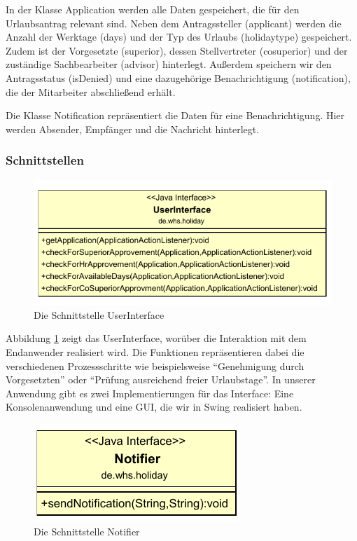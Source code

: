 In der Klasse Application werden alle Daten gespeichert, die für den Urlaubsantrag relevant sind. Neben dem Antragssteller (applicant) werden die Anzahl der Werktage (days) und der Typ des Urlaubs (holidaytype) gespeichert. Zudem ist der Vorgesetzte (superior), dessen Stellvertreter (cosuperior) und der zuständige Sachbearbeiter (advisor) hinterlegt. Außerdem speichern wir den Antragsstatus (isDenied) und eine dazugehörige Benachrichtigung (notification), die der Mitarbeiter abschließend erhält.

Die Klasse Notification repräsentiert die Daten für eine Benachrichtigung. Hier werden Absender, Empfänger und die Nachricht hinterlegt. 

\subsubsection{Schnittstellen}
\label{subsubsec:Schnittstellen}
\begin{figure}[H]
\centering
\includegraphics[width=0.7\linewidth]{Bilder/SchnittstelleUserInterface}
\caption{Die Schnittstelle UserInterface}
\label{fig:SchnittstelleUserInterface}
\end{figure}

Abbildung \ref{fig:SchnittstelleUserInterface} zeigt das UserInterface, worüber die Interaktion mit dem Endanwender realisiert wird. Die Funktionen repräsentieren dabei die verschiedenen Prozessschritte wie beispielsweise "`Genehmigung durch Vorgesetzten"' oder "`Prüfung ausreichend freier Urlaubstage"'. In unserer Anwendung gibt es zwei Implementierungen für das Interface: Eine Konsolenanwendung und eine GUI, die wir in Swing realisiert haben.

\begin{figure}[H]
\centering
\includegraphics[width=0.35\linewidth]{Bilder/SchnittstelleNotifier}
\caption{Die Schnittstelle Notifier}
\label{fig:SchnittstelleNotifier}
\end{figure}

